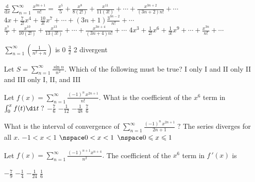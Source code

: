 \begin{question}
\(\frac{\text{d}}{\text{d} x} \sum_{n = 1}^\infty \frac{x^{3n + 1}}{n!} = \)
\choices
{\(\frac{x^5}{5} + \frac{x^8}{8(2!)} + \frac{x^{11}}{11(3!)} + \cdots + \frac{x^{3n + 2}}{(3n + 2) n!} + \cdots\)}
{\(4x + \frac{7}{2!} x^4 + \frac{10}{3!} x^7 + \cdots + (3n + 1) \frac{3^{3n - 2}}{n!} + \cdots\)}
{\(\frac{x^7}{7} + \frac{x^{10}}{10(2!)} + \frac{x^{13}}{13(3!)} + \cdots + \frac{x^{3n + 4}}{(3n + 4) n!} + \cdots \)}
{\(4x^3 + \frac{1}{2!} x^6 + \frac{1}{3!} x^9 + \cdots + \frac{x^{3n}}{n!} + \cdots\)}
{}
\end{question}

\begin{question}
\(\sum_{n = 1}^\infty \left(\frac{1}{n^2 + n}\right)\) is
\choicesline
{0}
{}
{\(\frac{3}{2}\)}
{2}
{divergent}
\end{question}

\begin{question}
Let \(S = \sum_{n = 1}^\infty \frac{\sin n}{n^2}.\) Which of the following must be true?
\choices
{I only}
{I and II only}
{}
{II and III only}
{I, II, and III}
\end{question}

\begin{question}
Let \(f(x) = \sum_{n = 1}^\infty \frac{(-1)^n \, x^{2n + 1}}{n!}.\) 
What is the coefficient of the \(x^6\) term in \(\int_0^x f(t) \di t \; ?\)
\choicesline
{\(-\frac{7}{6}\)}
{\(-\frac{1}{12}\)}
{\(-\frac{1}{48}\)}
{}
{\(\frac{7}{6}\)}
\end{question}

\clearpage

\begin{question}
What is the interval of convergence of \(\sum_{n = 1}^\infty \frac{(-1)^n \, x^{2n + 1}}{2n + 1} \; ?\)
\choices
{The series diverges for all \(x.\)}
{\(-1 < x < 1\)}
{}
{\(\nspace 0 < x < 1\)}
{\(\nspace 0 \leqslant x \leqslant 1\)}
\end{question}

\begin{question}
Let \(f(x) = \sum_{n = 1}^\infty \frac{(-1)^{n + 1} x^{n + 4} }{n^2}.\) The coefficient of the \(x^6\) term in \(f \, '(x)\) is 

\choicesline
{\(-\frac{7}{9}\)}
{\(-\frac{1}{4}\)}
{\(-\frac{1}{24}\)}
{\(\frac{1}{6}\)}
{}
\end{question}

